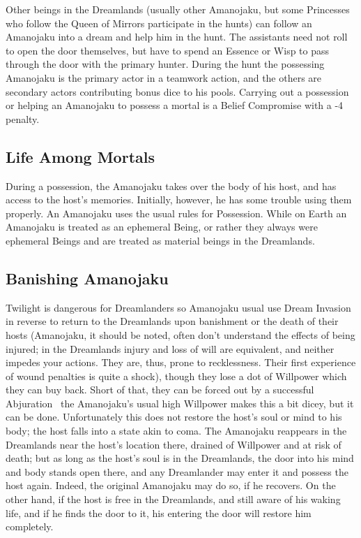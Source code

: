 Other beings in the Dreamlands (usually other Amanojaku, but some Princesses who follow the Queen of Mirrors participate in the hunts) can follow an Amanojaku into a dream and help him in the hunt. The assistants need not roll to open the door themselves, but have to spend an Essence or Wisp to pass through the door with the primary hunter. During the hunt the possessing Amanojaku is the primary actor in a teamwork action, and the others are secondary actors contributing bonus dice to his pools. Carrying out a possession or helping an Amanojaku to possess a mortal is a Belief Compromise with a -4 penalty. 

\subsection*{Life Among Mortals}

During a possession, the Amanojaku takes over the body of his host, and has access to the host's memories. Initially, however, he has some trouble using them properly. An Amanojaku uses the usual rules for Possession. While on Earth an Amanojaku is treated as an ephemeral Being, or rather they always were ephemeral Beings and are treated as material beings in the Dreamlands. 

\subsection*{Banishing Amanojaku}

Twilight is dangerous for Dreamlanders so Amanojaku usual use Dream Invasion in reverse to return to the Dreamlands upon banishment or the death of their hosts (Amanojaku, it should be noted, often don't understand the effects of being injured; in the Dreamlands injury and loss of will are equivalent, and neither impedes your actions. They are, thus, prone to recklessness. Their first experience of wound penalties is quite a shock), though they lose a dot of Willpower which they can buy back. Short of that, they can be forced out by a successful Abjuration \textendash\, the Amanojaku's usual high Willpower makes this a bit dicey, but it can be done. Unfortunately this does not restore the host's soul or mind to his body; the host falls into a state akin to coma. The Amanojaku reappears in the Dreamlands near the host's location there, drained of Willpower and at risk of death; but as long as the host's soul is in the Dreamlands, the door into his mind and body stands open there, and any Dreamlander may enter 
it and possess the host again. 
Indeed, the original 
Amanojaku may do so, if he recovers. On the other 
hand, if the host is free in the Dreamlands, and still aware of his waking life, and if he finds the door to it, his entering the door will restore him completely. 

